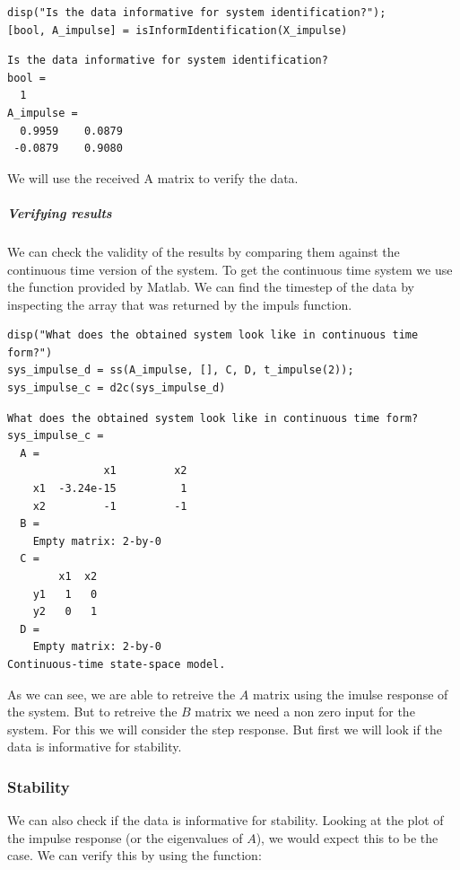 \begin{lstlisting}
disp("Is the data informative for system identification?");
[bool, A_impulse] = isInformIdentification(X_impulse)
\end{lstlisting}

\begin{verbatim}
Is the data informative for system identification?
bool = 
  1
A_impulse =
  0.9959    0.0879
 -0.0879    0.9080
\end{verbatim}

We will use the received A matrix to verify the data.

\subparagraph{Verifying results}
We can check the validity of the results by comparing them against the continuous time version of the system. To get the continuous time system we use the  function provided by Matlab. We can find the timestep of the data by inspecting the  array that was returned by the impuls function.

\begin{lstlisting}
disp("What does the obtained system look like in continuous time form?")
sys_impulse_d = ss(A_impulse, [], C, D, t_impulse(2));
sys_impulse_c = d2c(sys_impulse_d)
\end{lstlisting}

\begin{verbatim}
What does the obtained system look like in continuous time form?
sys_impulse_c =
  A = 
               x1         x2
    x1  -3.24e-15          1
    x2         -1         -1
  B = 
    Empty matrix: 2-by-0
  C = 
        x1  x2
    y1   1   0
    y2   0   1   
  D = 
    Empty matrix: 2-by-0
Continuous-time state-space model.
\end{verbatim}

As we can see, we are able to retreive the $A$ matrix using the imulse response of the system. But to retreive the $B$ matrix we need a non zero input for the system. For this we will consider the step response. But first we will look if the data is informative for stability.

\subsubsection{Stability}
We can also check if the data is informative for stability. Looking at the plot of the impulse response (or the eigenvalues of $A$), we would expect this to be the case. We can verify this by using the function:
\begin{center}
\end{center}

